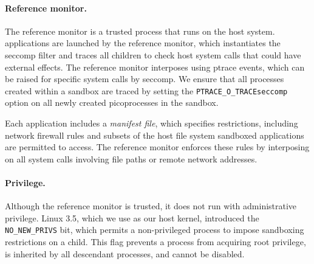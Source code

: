 \paragraph{Reference monitor.}
The reference monitor is a trusted process that runs on the host system.
\graphene{} applications are launched by the reference monitor,
which instantiates the seccomp filter and traces all children
to check host system calls that could have external effects.
The reference monitor interposes using ptrace events, 
which can be raised for specific system calls by seccomp.
We ensure that all processes created within a sandbox are traced
by setting the {\tt PTRACE\_O\_TRACEseccomp{}} option on all newly created picoprocesses
in the sandbox.


Each application includes a \emph{manifest file}, which specifies restrictions,
including network firewall rules and subsets of the host file system sandboxed
applications are permitted to access.  The reference monitor enforces these
rules by interposing on all system calls involving file paths or remote network addresses.

\paragraph{Privilege.~} 
Although the reference monitor is trusted, it does not run 
with administrative privilege.
Linux 3.5, which we use as our host kernel, 
introduced the {\tt NO\_NEW\_PRIVS} bit, which permits
a non-privileged process to impose sandboxing restrictions on a child.
This flag prevents a process from acquiring root privilege, %
is inherited by all descendant processes,
and cannot be disabled.

